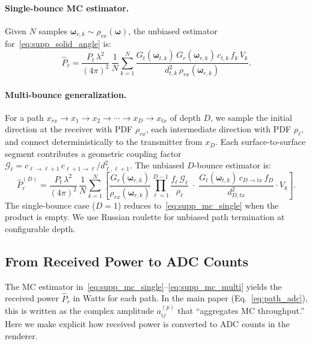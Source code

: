 \paragraph{Single-bounce MC estimator.}
Given $N$ samples $\boldsymbol{\omega}_{r,k} \sim \rho_{rx}(\boldsymbol{\omega})$, the unbiased estimator for~\eqref{eq:supp_solid_angle} is:
\begin{equation}
    \hat{P}_r
    =
    \frac{P_t\,\lambda^2}{(4\pi)^2}\,
    \frac{1}{N}\sum_{k=1}^{N}
    \frac{
    G_t(\boldsymbol{\omega}_{t,k})\,G_r(\boldsymbol{\omega}_{r,k})\,c_{t,k}\,f_k\,V_k
    }{
    d_{t,k}^2\,\rho_{rx}(\boldsymbol{\omega}_{r,k})
    }.
    \label{eq:supp_mc_single}
\end{equation}

\paragraph{Multi-bounce generalization.}
For a path $x_{rx} \to x_1 \to x_2 \to \cdots \to x_D \to x_{tx}$ of depth $D$, we sample the initial direction at the receiver with PDF $\rho_{rx}$, each intermediate direction with PDF $\rho_\ell$, and connect deterministically to the transmitter from $x_D$. Each surface-to-surface segment contributes a geometric coupling factor $\mathcal{G}_\ell = c_{\ell \to \ell+1}\, c_{\ell+1 \to \ell} / d_{\ell,\ell+1}^2$. The unbiased $D$-bounce estimator is:
\begin{equation}
    \hat{P}_r^{(D)}
    =
    \frac{P_t\,\lambda^2}{(4\pi)^2}\,
    \frac{1}{N}\sum_{k=1}^{N}
    \left[
    \frac{G_r(\boldsymbol{\omega}_{r,k})}{\rho_{rx}(\boldsymbol{\omega}_{r,k})}
    \prod_{\ell=1}^{D-1}
    \frac{f_\ell\, \mathcal{G}_\ell}{\rho_\ell}
    \;\cdot\;
    \frac{G_t(\boldsymbol{\omega}_{t,k})\, c_{D \to tx}\, f_D}{d_{D,tx}^2}
    \cdot V_k
    \right].
    \label{eq:supp_mc_multi}
\end{equation}
The single-bounce case ($D=1$) reduces to~\eqref{eq:supp_mc_single} when the product is empty. We use Russian roulette for unbiased path termination at configurable depth.

\subsection{From Received Power to ADC Counts}
\label{sec:supp_power_to_adc}

The MC estimator in~\eqref{eq:supp_mc_single}--\eqref{eq:supp_mc_multi} yields the received power $\hat{P}_r$ in Watts for each path. In the main paper (Eq.~\ref{eq:path_adc}), this is written as the complex amplitude $a_{ij}^{(p)}$ that ``aggregates MC throughput.'' Here we make explicit how received power is converted to ADC counts in the renderer.

